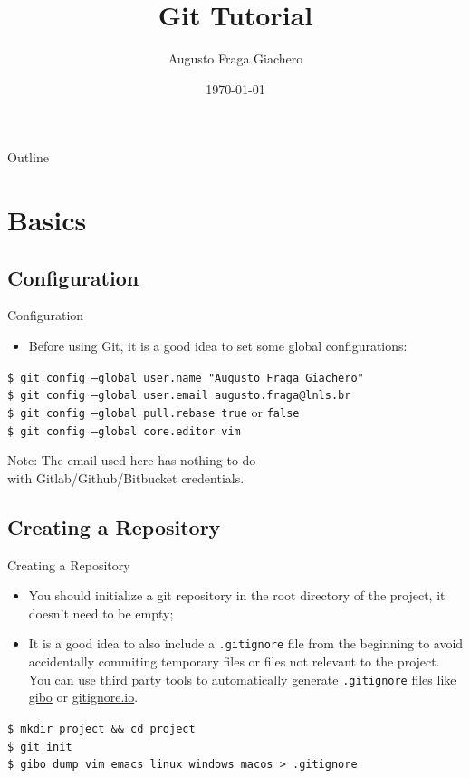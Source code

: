 \documentclass{beamer}
\title{Git Tutorial}
\author{Augusto Fraga Giachero}
\date{\today}
\begin{document}
\begin{frame}
  \titlepage
\end{frame}

\begin{frame}{Outline}
  \tableofcontents
\end{frame}

\section{Basics}

\subsection{Configuration}
\begin{frame}{Configuration}
  \begin{itemize}
    \item Before using Git, it is a good idea to set some global configurations:
  \end{itemize}
  \begin{block}{}
    \texttt{\$ git config --global user.name "Augusto Fraga Giachero"} \\
    \texttt{\$ git config --global user.email augusto.fraga@lnls.br} \\
    \texttt{\$ git config --global pull.rebase true} or \texttt{false} \\
    \texttt{\$ git config --global core.editor vim}
  \end{block}
  \begin{flushright}
    Note: The email used here has nothing to do \\ with Gitlab/Github/Bitbucket credentials.
  \end{flushright}
\end{frame}

\subsection{Creating a Repository}
\begin{frame}{Creating a Repository}
  \begin{itemize}
    \item You should initialize a git repository in the root directory of the project, it doesn't need to be empty;
    \item It is a good idea to also include a \texttt{.gitignore} file from the beginning to avoid accidentally commiting temporary files or files not relevant to the project. You can use third party tools to automatically generate \texttt{.gitignore} files like \href{https://github.com/simonwhitaker/gibo}{gibo} or \href{https://www.toptal.com/developers/gitignore/}{gitignore.io}.
  \end{itemize}
  \begin{block}{}
    \texttt{\$ mkdir project \&\& cd project} \\
    \texttt{\$ git init} \\
    \texttt{\$ gibo dump vim emacs linux windows macos > .gitignore}
  \end{block}
\end{frame}
\end{document}
